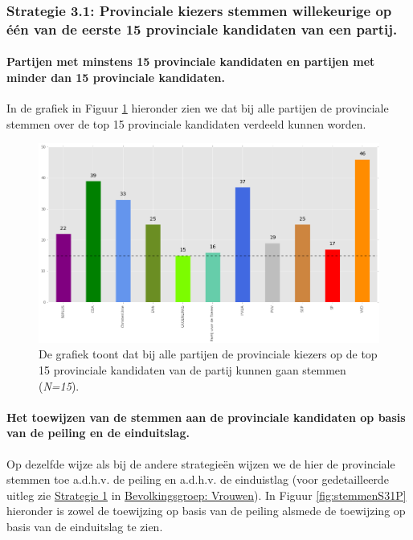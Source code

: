 \subsubsection{Strategie 3.1: Provinciale kiezers stemmen willekeurige op één van de eerste 15 provinciale kandidaten van een partij.}

\paragraph{Partijen met minstens 15 provinciale kandidaten en partijen met minder dan 15 provinciale kandidaten.}
In de grafiek in Figuur \ref{fig:15P} hieronder zien we dat bij alle partijen de provinciale stemmen over de top 15 provinciale kandidaten verdeeld kunnen worden.

\begin{figure}[H]

	\includegraphics[width=\linewidth]	{top15_of_topN_kandidaten_provincialen.png}

			\caption{De grafiek toont dat bij alle partijen de provinciale kiezers op de top 15 provinciale kandidaten van de partij kunnen gaan stemmen (\textit{N=15}).}

\label{fig:15P}
\end{figure}


\paragraph{Het toewijzen van de stemmen aan de provinciale kandidaten op basis van de peiling en de einduitslag.}
Op dezelfde wijze als bij de andere strategie\"{e}n wijzen we de hier de provinciale stemmen toe a.d.h.v. de peiling en a.d.h.v. de einduistlag (voor gedetailleerde uitleg zie \hyperref[S1V]{Strategie 1} in \hyperref[vrouwen]{Bevolkingsgroep: Vrouwen}). In Figuur \ref{fig:stemmenS31P} hieronder is zowel de toewijzing op basis van de peiling alsmede de toewijzing op basis van de einduitslag te zien.

